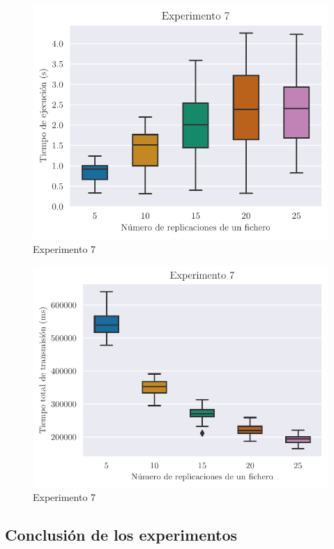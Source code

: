 \begin{figure}[H]
    \centering
    \includegraphics{include/plots/ex7_time_bplot.pdf}
    \caption{Experimento 7}%
    \label{fig:ex7time}
\end{figure}

\begin{figure}[H]
    \centering
    \includegraphics{include/plots/ex7_ttt_bplot.pdf}
    \caption{Experimento 7}%
    \label{fig:ex7ttt}
\end{figure}

\subsection{Conclusión de los experimentos}
    
    
    
